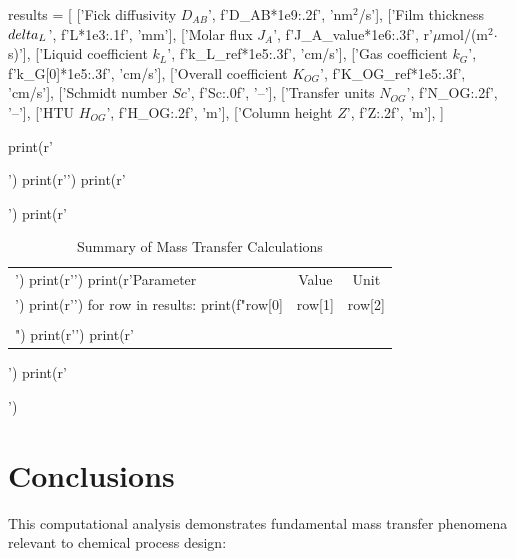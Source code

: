 \documentclass[11pt,a4paper]{article}
\begin{document}
\begin{pycode}
results = [
    ['Fick diffusivity $D_{AB}$', f'{D_AB*1e9:.2f}', 'nm$^2$/s'],
    ['Film thickness $\\delta_L$', f'{L*1e3:.1f}', 'mm'],
    ['Molar flux $J_A$', f'{J_A_value*1e6:.3f}', r'$\mu$mol/(m$^2$$\cdot$s)'],
    ['Liquid coefficient $k_L$', f'{k_L_ref*1e5:.3f}', 'cm/s'],
    ['Gas coefficient $k_G$', f'{k_G[0]*1e5:.3f}', 'cm/s'],
    ['Overall coefficient $K_{OG}$', f'{K_OG_ref*1e5:.3f}', 'cm/s'],
    ['Schmidt number $Sc$', f'{Sc:.0f}', '--'],
    ['Transfer units $N_{OG}$', f'{N_OG:.2f}', '--'],
    ['HTU $H_{OG}$', f'{H_OG:.2f}', 'm'],
    ['Column height $Z$', f'{Z:.2f}', 'm'],
]

print(r'\begin{table}[H]')
print(r'\centering')
print(r'\caption{Summary of Mass Transfer Calculations}')
print(r'\begin{tabular}{@{}lcc@{}}')
print(r'\toprule')
print(r'Parameter & Value & Unit \\')
print(r'\midrule')
for row in results:
    print(f"{row[0]} & {row[1]} & {row[2]} \\\\")
print(r'\bottomrule')
print(r'\end{tabular}')
print(r'\end{table}')
\end{pycode}

\section{Conclusions}

This computational analysis demonstrates fundamental mass transfer phenomena relevant to chemical process design:
\end{document}
